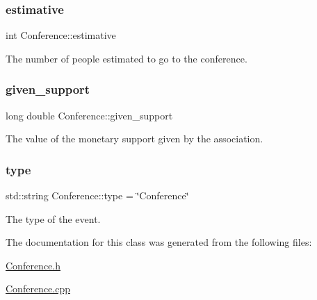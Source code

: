 \subsubsection{\texorpdfstring{estimative}{estimative}}
{\footnotesize\ttfamily int Conference\+::estimative\hspace{0.3cm}{\ttfamily [private]}}



The number of people estimated to go to the conference. 

\mbox{\label{classConference_a800a31bff9c492bc417cf8cecf450195}} 
\subsubsection{\texorpdfstring{given\+\_\+support}{given\_support}}
{\footnotesize\ttfamily long double Conference\+::given\+\_\+support\hspace{0.3cm}{\ttfamily [private]}}



The value of the monetary support given by the association. 

\mbox{\label{classConference_af456d5097dc28808360f0d0fba2160c6}} 
\subsubsection{\texorpdfstring{type}{type}}
{\footnotesize\ttfamily std\+::string Conference\+::type = \char`\"{}Conference\char`\"{}\hspace{0.3cm}{\ttfamily [private]}}



The type of the event. 



The documentation for this class was generated from the following files\+:\begin{DoxyCompactItemize}
\item 
\mbox{\hyperlink{Conference_8h}{Conference.\+h}}\item 
\mbox{\hyperlink{Conference_8cpp}{Conference.\+cpp}}\end{DoxyCompactItemize}
